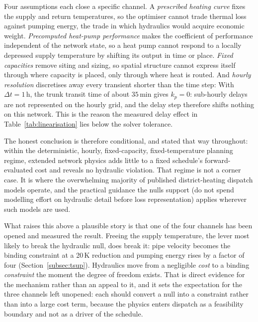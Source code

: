 \documentclass[a4paper,fleqn]{cas-sc}
\begin{document}
Four assumptions each close a specific channel. A \emph{prescribed heating curve} fixes the
supply and return temperatures, so the optimiser cannot trade thermal loss against pumping
energy, the trade in which hydraulics would acquire economic weight. \emph{Precomputed
heat-pump performance} makes the coefficient of performance independent of the network
state, so a heat pump cannot respond to a locally depressed supply temperature by shifting
its output in time or place. \emph{Fixed capacities} remove siting and sizing, so spatial
structure cannot express itself through where capacity is placed, only through where heat
is routed. And \emph{hourly resolution} discretises away every transient shorter than the
time step: With $\Delta t = 1$\,h, the trunk transit time of about $35$\,min gives $k_p = 0$: sub-hourly
delays are not represented on the hourly grid, and the delay step therefore shifts nothing on
this network. This is the reason the measured delay effect in
Table~\ref{tab:linearisation} lies below the solver tolerance.

The honest conclusion is therefore conditional, and stated that way throughout: within
the deterministic, hourly, fixed-capacity, fixed-temperature planning regime, extended
network physics adds little to a fixed schedule's forward-evaluated cost and reveals no
hydraulic violation. That regime is not a corner case. It is
where the overwhelming majority of published district-heating dispatch models operate, and
the practical guidance the nulls support (do not spend modelling effort on hydraulic
detail before loss representation) applies wherever such models are used.

What raises this above a plausible story is that one of the four channels has been opened
and measured the result. Freeing the supply temperature, the lever most likely to break the
hydraulic null, does break it: pipe velocity becomes the binding constraint at a 20\,K
reduction and pumping energy rises by a factor of four
(Section~\ref{subsec:tsup}). Hydraulics move from a negligible \emph{cost} to a binding
\emph{constraint} the moment the degree of freedom exists. That is direct evidence for the
mechanism rather than an appeal to it, and it sets the expectation for the three channels
left unopened: each should convert a null into a constraint rather than into a large cost
term, because the physics enters dispatch as a feasibility boundary and not as a driver of
the schedule.
\end{document}
